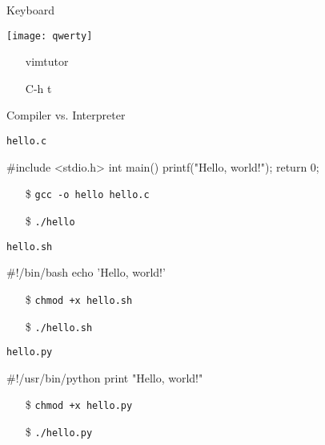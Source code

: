 \begin{frame}{Keyboard}
  \begin{center}
    \texttt{[image: qwerty]}
  \end{center}
  \begin{itemize}
  \item[\vim] vimtutor
  \item[\emacs] C-h t
  \end{itemize}
\end{frame}

\begin{frame}[fragile]{Compiler vs. Interpreter}
  \begin{block}{\texttt{hello.c}}
    \begin{minipage}{.5\linewidth}
\begin{ccode}
#include <stdio.h>
int main()
{
  printf("Hello, world!\n");
  return 0;
}
\end{ccode}
    \end{minipage}
    \begin{minipage}{.45\linewidth}
    \begin{itemize}
    \item[\$] \texttt{gcc -o hello hello.c}
    \item[\$] \texttt{./hello}
    \end{itemize}
    \end{minipage}
  \end{block}
  \begin{block}{\texttt{hello.sh}}
    \begin{minipage}{.5\linewidth}
      \begin{shellcode}
        #!/bin/bash
        echo 'Hello, world!'
      \end{shellcode}
    \end{minipage}
    \begin{minipage}{.45\linewidth}
      \begin{enumerate}
      \item[\$] \texttt{chmod +x hello.sh}
      \item[\$] \texttt{./hello.sh}
      \end{enumerate}
    \end{minipage}
  \end{block}
  \begin{block}{\texttt{hello.py}}
    \begin{minipage}{.5\linewidth}
\begin{pythoncode}
#!/usr/bin/python
print "Hello, world!"
\end{pythoncode}      
    \end{minipage}
    \begin{minipage}{.45\linewidth}
      \begin{enumerate}
      \item[\$] \texttt{chmod +x hello.py}
      \item[\$] \texttt{./hello.py}
      \end{enumerate}
    \end{minipage}
  \end{block}
\end{frame}

